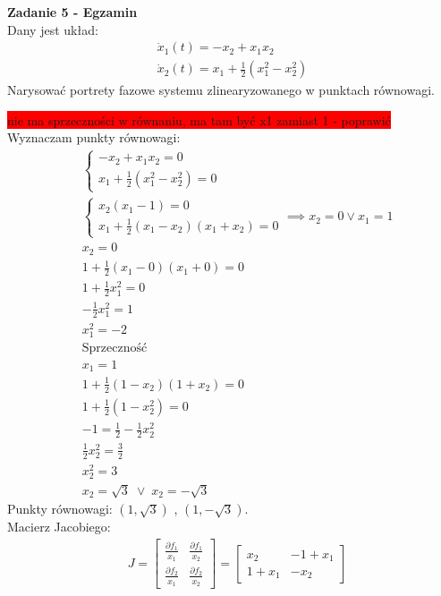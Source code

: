 \documentclass[a4paper,11pt]{article}
\begin{document}
\newpage
\begin{framed}
\textbf{Zadanie 5 - Egzamin}  \\ 
Dany jest układ:
\begin{align*}
\dot{x}_{1}(t)=-x_2+x_1x_2 \\
\dot{x}_{2}(t)=x_1+\frac{1}{2}(x_1^2-x_2^2)
\end{align*}
Narysować portrety fazowe systemu zlinearyzowanego w punktach równowagi.
\end{framed}
\colorbox{red}{nie ma sprzeczności w równaniu, ma tam być x1 zamiast 1 - poprawić } \\
Wyznaczam punkty równowagi:
\begin{align*}
&\begin{cases}
-x_2+x_1x_2=0 \\
x_1+\frac{1}{2}(x_1^2-x_2^2) = 0 
\end{cases} \\
&\begin{cases}
x_2(x_1-1)=0 \\
x_1+\frac{1}{2}(x_1-x_2)(x_1+x_2) = 0 
\end{cases}
\implies
x_2 = 0 \lor x_1 = 1 \\
&x_2 = 0 \\
&1+\frac{1}{2}(x_1-0)(x_1+0)=0 \\
&1+\frac{1}{2}x_1^2=0 \\
&-\frac{1}{2}x_1^2 = 1 \\
&x_1^2=-2\\
&\text{Sprzeczność} \\
&x_1=1 \\
&1+\frac{1}{2}(1-x_2)(1+x_2)=0 \\
&1+\frac{1}{2}(1-x_2^2)=0 \\
&-1 = \frac{1}{2}-\frac{1}{2}x_2^2 \\
&\frac{1}{2}x_2^2=\frac{3}{2} \\
&x_2^2=3 \\
&x_2=\sqrt{3} \; \lor \; x_2=-\sqrt{3}
\end{align*}
Punkty równowagi: \( (1,\sqrt{3}) \) \; , \( (1, -\sqrt{3} ) \). \\
Macierz Jacobiego:
\begin{align*}
&J = 
\begin{bmatrix}
\frac{\partial f_1}{x_1} & \frac{\partial f_1}{x_2} \\
\frac{\partial f_2}{x_1} &  \frac{\partial f_2}{x_2}
\end{bmatrix}
=
\begin{bmatrix}
x_2 & -1+x_1 \\
1+x_1 & -x_2
\end{bmatrix}
\end{align*}
\end{document}
